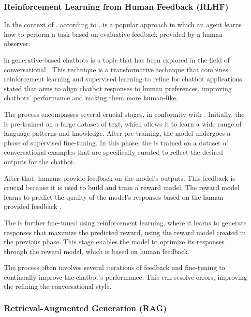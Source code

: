 \subsubsection{Reinforcement Learning from Human Feedback (RLHF)}

In the context of {\ai}, according to \citet{li_human-centered_2019}, {\rlhf} is a popular approach in which an agent learns how to perform a task based on evaluative feedback provided by a human observer.

{\rlhf} in generative-based chatbots is a topic that has been explored in the field of conversational {\ai}. This technique is a transformative technique that combines reinforcement learning and supervised learning to refine {\llm} for chatbot applications. \citet{tran_enhancing_2023} stated that {\rlhf} aims to align chatbot responses to human preferences, improving chatbots' performance and making them more human-like.

The process encompasses several crucial stages, in conformity with \citet{axelsson_modeling_2022}. Initially, the {\llm} is pre-trained on a large dataset of text, which allows it to learn a wide range of language patterns and knowledge. After pre-training, the model undergoes a phase of supervised fine-tuning. In this phase, the {\llm} is trained on a dataset of conversational examples that are specifically curated to reflect the desired outputs for the chatbot. 

After that, humans provide feedback on the model's outputs. This feedback is crucial because it is used to build and train a reward model. The reward model learns to predict the quality of the model's responses based on the human-provided feedback \cite{axelsson_modeling_2022}.

The {\llm} is further fine-tuned using reinforcement learning, where it learns to generate responses that maximize the predicted reward, using the reward model created in the previous phase. This stage enables the model to optimize its responses through the reward model, which is based on human feedback.

The process often involves several iterations of feedback and fine-tuning to continually improve the chatbot's performance. This can resolve errors, improving the refining the conversational style.



\subsubsection{Retrieval-Augmented Generation (RAG)}
\label{rag_section}


